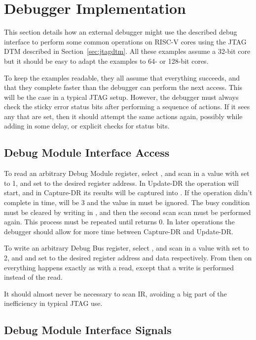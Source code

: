 \chapter{Debugger Implementation}

This section details how an external debugger might use the described debug
interface to perform some common operations on RISC-V cores using the JTAG DTM
described in Section~\ref{sec:jtagdtm}.
All these examples assume a 32-bit core but it should be easy to adapt the
examples to 64- or 128-bit cores.

To keep the examples readable, they all assume that everything succeeds, and
that they complete faster than the debugger can perform the next access. This
will be the case in a typical JTAG setup. However, the debugger must always
check the sticky error status bits after performing a sequence of actions. If
it sees any that are set, then it should attempt the same actions again,
possibly while adding in some delay, or explicit checks for status bits.

\section{Debug Module Interface Access} \label{dmiaccess}

To read an arbitrary Debug Module register, select \RdtmDmi, and scan in a value
with \FdtmDmiOp set to 1, and \FdmSbaddressZeroAddress set to the desired register address. In
Update-DR the operation will start, and in Capture-DR its results will be
captured into \FdmSbdataZeroData.  If the operation didn't complete in time, \FdtmDmiOp will be 3
and the value in \FdmSbdataZeroData must be ignored. The busy condition must be cleared by
writing \FdtmDtmcsDmireset in \RdtmDtmcs, and then the second scan scan must be performed again.
This process must be repeated until \FdtmDmiOp returns 0.
In later operations the debugger should allow for more time between Capture-DR and
Update-DR.

To write an arbitrary Debug Bus register, select \RdtmDmi, and scan in a value
with \FdtmDmiOp set to 2, and \FdmSbaddressZeroAddress and \FdmSbdataZeroData set to the desired register
address and data respectively. From then on everything happens exactly as with
a read, except that a write is performed instead of the read.

It should almost never be necessary to scan IR, avoiding a big part of the
inefficiency in typical JTAG use.

\section{Debug Module Interface Signals} \label{dmi_signals}

